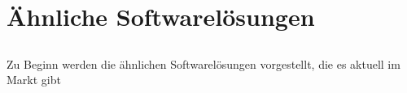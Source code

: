\chapter{Ähnliche Softwarelösungen}

\section{}

Zu Beginn werden die ähnlichen Softwarelösungen vorgestellt, die es aktuell im Markt gibt 

    